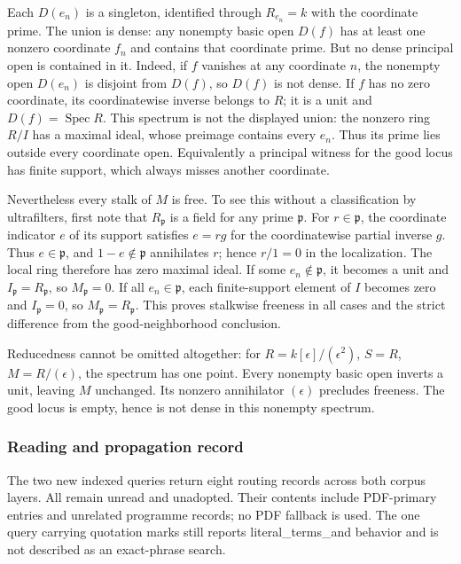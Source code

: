 Each \(D(e_n)\) is a singleton, identified through \(R_{e_n}=k\) with the coordinate prime. The union is dense: any nonempty basic open \(D(f)\) has at least one nonzero coordinate \(f_n\) and contains that coordinate prime. But no dense principal open is contained in it. Indeed, if \(f\) vanishes at any coordinate \(n\), the nonempty open \(D(e_n)\) is disjoint from \(D(f)\), so \(D(f)\) is not dense. If \(f\) has no zero coordinate, its coordinatewise inverse belongs to \(R\); it is a unit and \(D(f)=\operatorname{Spec}R\). This spectrum is not the displayed union: the nonzero ring \(R/I\) has a maximal ideal, whose preimage contains every \(e_n\). Thus its prime lies outside every coordinate open. Equivalently a principal witness for the good locus has finite support, which always misses another coordinate.

Nevertheless every stalk of \(M\) is free. To see this without a classification by ultrafilters, first note that \(R_{\mathfrak p}\) is a field for any prime \(\mathfrak p\). For \(r\in\mathfrak p\), the coordinate indicator \(e\) of its support satisfies \(e=rg\) for the coordinatewise partial inverse \(g\). Thus \(e\in\mathfrak p\), and \(1-e\notin\mathfrak p\) annihilates \(r\); hence \(r/1=0\) in the localization. The local ring therefore has zero maximal ideal. If some \(e_n\notin\mathfrak p\), it becomes a unit and \(I_{\mathfrak p}=R_{\mathfrak p}\), so \(M_{\mathfrak p}=0\). If all \(e_n\in\mathfrak p\), each finite-support element of \(I\) becomes zero and \(I_{\mathfrak p}=0\), so \(M_{\mathfrak p}=R_{\mathfrak p}\). This proves stalkwise freeness in all cases and the strict difference from the good-neighborhood conclusion.

Reducedness cannot be omitted altogether: for \(R=k[\epsilon]/(\epsilon^2)\), \(S=R\), \(M=R/(\epsilon)\), the spectrum has one point. Every nonempty basic open inverts a unit, leaving \(M\) unchanged. Its nonzero annihilator \((\epsilon)\) precludes freeness. The good locus is empty, hence is not dense in this nonempty spectrum.

\subsubsection{Reading and propagation record}\label{reading-and-propagation-record}

The two new indexed queries return eight routing records across both corpus layers. All remain unread and unadopted. Their contents include PDF-primary entries and unrelated programme records; no PDF fallback is used. The one query carrying quotation marks still reports literal\_terms\_and behavior and is not described as an exact-phrase search.

